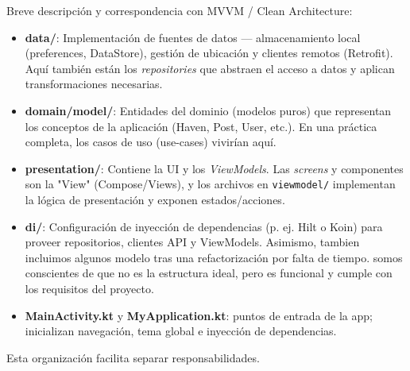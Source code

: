 Breve descripción y correspondencia con MVVM / Clean Architecture:
\begin{itemize}
  \item \textbf{data/}: Implementación de fuentes de datos — almacenamiento local (preferences, DataStore), gestión de ubicación y clientes remotos (Retrofit). Aquí también están los \textit{repositories} que abstraen el acceso a datos y aplican transformaciones necesarias.
  \item \textbf{domain/model/}: Entidades del dominio (modelos puros) que representan los conceptos de la aplicación (Haven, Post, User, etc.). En una práctica completa, los casos de uso (use-cases) vivirían aquí.
  \item \textbf{presentation/}: Contiene la UI y los \textit{ViewModels}. Las \textit{screens} y componentes son la 
  "View" (Compose/Views), y los archivos en \texttt{viewmodel/} implementan la lógica de presentación y 
  exponen estados/acciones.
  \item \textbf{di/}: Configuración de inyección de dependencias (p. ej. Hilt o Koin) para proveer repositorios, 
  clientes API y ViewModels. Asimismo, tambien incluimos algunos modelo tras una refactorización por falta de tiempo.
  somos conscientes de que no es la estructura ideal, pero es funcional y cumple con los requisitos del proyecto.
  \item \textbf{MainActivity.kt} y \textbf{MyApplication.kt}: puntos de entrada de la app; inicializan navegación, 
  tema global e inyección de dependencias.
\end{itemize}

Esta organización facilita separar responsabilidades.
